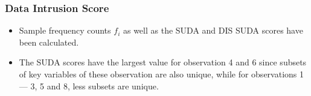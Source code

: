 \documentclass{beamer}
\begin{document}
	\begin{frame}
		\frametitle{Data Intrusion Score}
		\begin{itemize} 			
			\item Sample frequency
			counts $f_i$ as well as the SUDA and DIS SUDA scores have been calculated. 
			\item The
			SUDA scores have the largest value for observation 4 and 6 since subsets of key
			variables of these observation are also unique, while for observations 1 — 3, 5 and
			8, less subsets are unique.
		\end{itemize}
	\end{frame}
\end{document}

